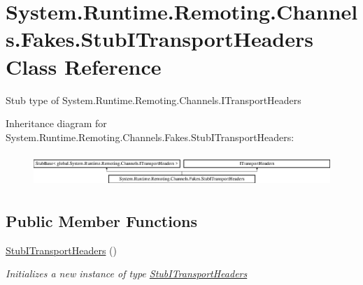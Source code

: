 \hypertarget{class_system_1_1_runtime_1_1_remoting_1_1_channels_1_1_fakes_1_1_stub_i_transport_headers}{\section{System.\-Runtime.\-Remoting.\-Channels.\-Fakes.\-Stub\-I\-Transport\-Headers Class Reference}
\label{class_system_1_1_runtime_1_1_remoting_1_1_channels_1_1_fakes_1_1_stub_i_transport_headers}
}


Stub type of System.\-Runtime.\-Remoting.\-Channels.\-I\-Transport\-Headers 


Inheritance diagram for System.\-Runtime.\-Remoting.\-Channels.\-Fakes.\-Stub\-I\-Transport\-Headers\-:\begin{figure}[H]
\begin{center}
\leavevmode
\includegraphics[height=1.261261cm]{class_system_1_1_runtime_1_1_remoting_1_1_channels_1_1_fakes_1_1_stub_i_transport_headers}
\end{center}
\end{figure}
\subsection*{Public Member Functions}
\begin{DoxyCompactItemize}
\item 
\hyperlink{class_system_1_1_runtime_1_1_remoting_1_1_channels_1_1_fakes_1_1_stub_i_transport_headers_ab524eaffa09adf1c182fa78927ac7a40}{Stub\-I\-Transport\-Headers} ()
\begin{DoxyCompactList}\small\item\em Initializes a new instance of type \hyperlink{class_system_1_1_runtime_1_1_remoting_1_1_channels_1_1_fakes_1_1_stub_i_transport_headers}{Stub\-I\-Transport\-Headers}\end{DoxyCompactList}\end{DoxyCompactItemize}

